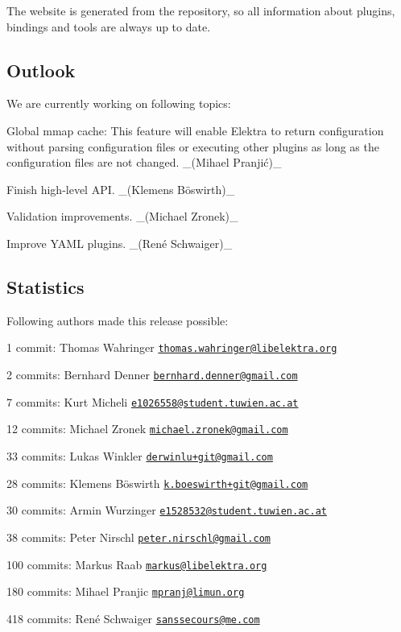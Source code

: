 The website is generated from the repository, so all information about plugins, bindings and tools are always up to date.

\subsection*{Outlook}

We are currently working on following topics\+:


\begin{DoxyItemize}
\item Global mmap cache\+: This feature will enable Elektra to return configuration without parsing configuration files or executing other plugins as long as the configuration files are not changed. \+\_\+(Mihael Pranjić)\+\_\+
\item Finish high-\/level A\+PI. \+\_\+(Klemens Böswirth)\+\_\+
\item Validation improvements. \+\_\+(\+Michael Zronek)\+\_\+
\item Improve Y\+A\+ML plugins. \+\_\+(René Schwaiger)\+\_\+
\end{DoxyItemize}

\subsection*{Statistics}

Following authors made this release possible\+:


\begin{DoxyItemize}
\item 1 commit\+: Thomas Wahringer \href{mailto:thomas.wahringer@libelektra.org}{\tt thomas.\+wahringer@libelektra.\+org}
\item 2 commits\+: Bernhard Denner \href{mailto:bernhard.denner@gmail.com}{\tt bernhard.\+denner@gmail.\+com}
\item 7 commits\+: Kurt Micheli \href{mailto:e1026558@student.tuwien.ac.at}{\tt e1026558@student.\+tuwien.\+ac.\+at}
\item 12 commits\+: Michael Zronek \href{mailto:michael.zronek@gmail.com}{\tt michael.\+zronek@gmail.\+com}
\item 33 commits\+: Lukas Winkler \href{mailto:derwinlu+git@gmail.com}{\tt derwinlu+git@gmail.\+com}
\item 28 commits\+: Klemens Böswirth \href{mailto:k.boeswirth+git@gmail.com}{\tt k.\+boeswirth+git@gmail.\+com}
\item 30 commits\+: Armin Wurzinger \href{mailto:e1528532@student.tuwien.ac.at}{\tt e1528532@student.\+tuwien.\+ac.\+at}
\item 38 commits\+: Peter Nirschl \href{mailto:peter.nirschl@gmail.com}{\tt peter.\+nirschl@gmail.\+com}
\item 100 commits\+: Markus Raab \href{mailto:markus@libelektra.org}{\tt markus@libelektra.\+org}
\item 180 commits\+: Mihael Pranjic \href{mailto:mpranj@limun.org}{\tt mpranj@limun.\+org}
\item 418 commits\+: René Schwaiger \href{mailto:sanssecours@me.com}{\tt sanssecours@me.\+com}
\end{DoxyItemize}

